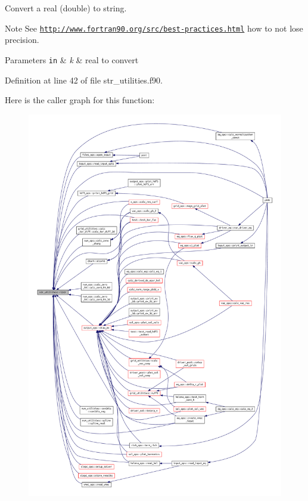 Convert a real (double) to string. 

\begin{DoxyNote}{Note}
See \href{http://www.fortran90.org/src/best-practices.html}{\tt http\+://www.\+fortran90.\+org/src/best-\/practices.\+html} how to not lose precision.
\end{DoxyNote}

\begin{DoxyParams}[1]{Parameters}
\mbox{\tt in}  & {\em k} & real to convert \\
\hline
\end{DoxyParams}


Definition at line 42 of file str\+\_\+utilities.\+f90.

Here is the caller graph for this function\+:\nopagebreak
\begin{figure}[H]
\begin{center}
\leavevmode
\includegraphics[width=350pt]{namespacestr__utilities_a92ac6c0af1979df094de1caddd28ade0_icgraph}
\end{center}
\end{figure}
\mbox{\label{namespacestr__utilities_ac778d706b2e021672618939ab58fdd32}} 
